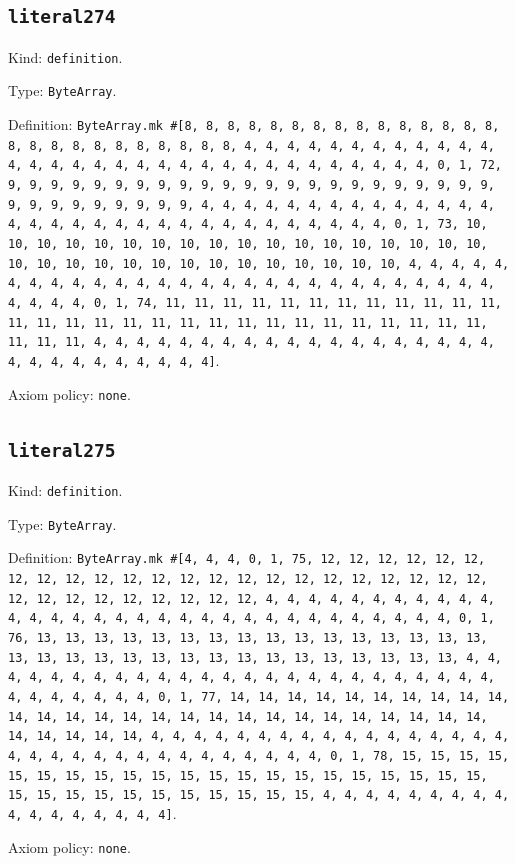 \documentclass[11pt]{article}
\begin{document}
\subsection*{\texttt{literal274}}
\noindent Kind: \texttt{definition}.\par
\noindent Type: \texttt{ByteArray}.\par
\noindent Definition: \texttt{ByteArray.mk \#[8, 8, 8, 8, 8, 8, 8, 8, 8, 8, 8, 8, 8, 8, 8, 8, 8, 8, 8, 8, 8, 8, 8, 8, 8, 8, 4, 4, 4, 4, 4, 4, 4, 4, 4, 4, 4, 4, 4, 4, 4, 4, 4, 4, 4, 4, 4, 4, 4, 4, 4, 4, 4, 4, 4, 4, 4, 4, 0, 1, 72, 9, 9, 9, 9, 9, 9, 9, 9, 9, 9, 9, 9, 9, 9, 9, 9, 9, 9, 9, 9, 9, 9, 9, 9, 9, 9, 9, 9, 9, 9, 9, 9, 4, 4, 4, 4, 4, 4, 4, 4, 4, 4, 4, 4, 4, 4, 4, 4, 4, 4, 4, 4, 4, 4, 4, 4, 4, 4, 4, 4, 4, 4, 4, 4, 0, 1, 73, 10, 10, 10, 10, 10, 10, 10, 10, 10, 10, 10, 10, 10, 10, 10, 10, 10, 10, 10, 10, 10, 10, 10, 10, 10, 10, 10, 10, 10, 10, 10, 10, 4, 4, 4, 4, 4, 4, 4, 4, 4, 4, 4, 4, 4, 4, 4, 4, 4, 4, 4, 4, 4, 4, 4, 4, 4, 4, 4, 4, 4, 4, 4, 4, 0, 1, 74, 11, 11, 11, 11, 11, 11, 11, 11, 11, 11, 11, 11, 11, 11, 11, 11, 11, 11, 11, 11, 11, 11, 11, 11, 11, 11, 11, 11, 11, 11, 11, 11, 4, 4, 4, 4, 4, 4, 4, 4, 4, 4, 4, 4, 4, 4, 4, 4, 4, 4, 4, 4, 4, 4, 4, 4, 4, 4, 4, 4, 4]}.\par
\noindent Axiom policy: \texttt{none}.\par
\subsection*{\texttt{literal275}}
\noindent Kind: \texttt{definition}.\par
\noindent Type: \texttt{ByteArray}.\par
\noindent Definition: \texttt{ByteArray.mk \#[4, 4, 4, 0, 1, 75, 12, 12, 12, 12, 12, 12, 12, 12, 12, 12, 12, 12, 12, 12, 12, 12, 12, 12, 12, 12, 12, 12, 12, 12, 12, 12, 12, 12, 12, 12, 12, 12, 4, 4, 4, 4, 4, 4, 4, 4, 4, 4, 4, 4, 4, 4, 4, 4, 4, 4, 4, 4, 4, 4, 4, 4, 4, 4, 4, 4, 4, 4, 4, 4, 0, 1, 76, 13, 13, 13, 13, 13, 13, 13, 13, 13, 13, 13, 13, 13, 13, 13, 13, 13, 13, 13, 13, 13, 13, 13, 13, 13, 13, 13, 13, 13, 13, 13, 13, 4, 4, 4, 4, 4, 4, 4, 4, 4, 4, 4, 4, 4, 4, 4, 4, 4, 4, 4, 4, 4, 4, 4, 4, 4, 4, 4, 4, 4, 4, 4, 4, 0, 1, 77, 14, 14, 14, 14, 14, 14, 14, 14, 14, 14, 14, 14, 14, 14, 14, 14, 14, 14, 14, 14, 14, 14, 14, 14, 14, 14, 14, 14, 14, 14, 14, 14, 4, 4, 4, 4, 4, 4, 4, 4, 4, 4, 4, 4, 4, 4, 4, 4, 4, 4, 4, 4, 4, 4, 4, 4, 4, 4, 4, 4, 4, 4, 4, 4, 0, 1, 78, 15, 15, 15, 15, 15, 15, 15, 15, 15, 15, 15, 15, 15, 15, 15, 15, 15, 15, 15, 15, 15, 15, 15, 15, 15, 15, 15, 15, 15, 15, 15, 15, 4, 4, 4, 4, 4, 4, 4, 4, 4, 4, 4, 4, 4, 4, 4, 4, 4]}.\par
\noindent Axiom policy: \texttt{none}.\par
\end{document}
